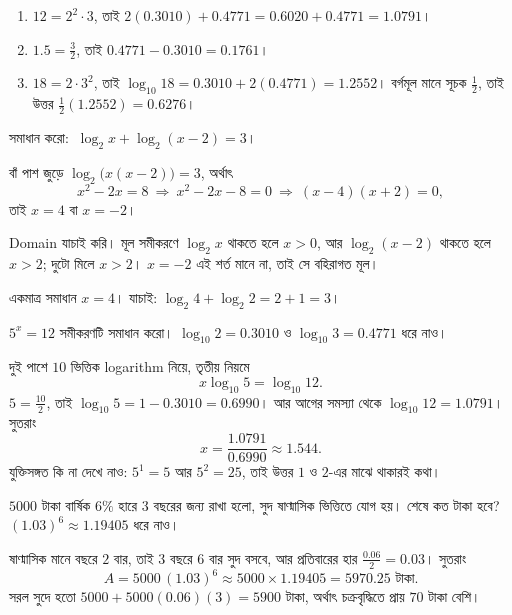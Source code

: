 \documentclass[11pt]{article}
\begin{document}
\begin{sol}
\begin{enumerate}
  \item $12 = 2^{2} \cdot 3$, তাই
        $2(0.3010) + 0.4771 = 0.6020 + 0.4771 = 1.0791$।
  \item $1.5 = \tfrac{3}{2}$, তাই $0.4771 - 0.3010 = 0.1761$।
  \item $18 = 2 \cdot 3^{2}$, তাই $\log_{10} 18 = 0.3010 + 2(0.4771) = 1.2552$।
        বর্গমূল মানে সূচক $\tfrac{1}{2}$, তাই উত্তর
        $\tfrac{1}{2}(1.2552) = 0.6276$।
\end{enumerate}
\end{sol}

 সমাধান করো: $\ \log_2 x + \log_2 (x - 2) = 3$।

\begin{sol}
বাঁ পাশ জুড়ে $\log_2 \big( x(x-2) \big) = 3$, অর্থাৎ
\[
  x^{2} - 2x = 8 \ \Longrightarrow\ x^{2} - 2x - 8 = 0
  \ \Longrightarrow\ (x-4)(x+2) = 0 ,
\]
তাই $x = 4$ বা $x = -2$।

Domain যাচাই করি। মূল সমীকরণে $\log_2 x$ থাকতে হলে $x > 0$, আর
$\log_2(x-2)$ থাকতে হলে $x > 2$; দুটো মিলে $x > 2$। $x = -2$ এই শর্ত মানে না,
তাই সে বহিরাগত মূল।

একমাত্র সমাধান $x = 4$। যাচাই: $\log_2 4 + \log_2 2 = 2 + 1 = 3$।
\end{sol}

 $5^{x} = 12$ সমীকরণটি সমাধান করো। $\log_{10} 2 = 0.3010$ ও
$\log_{10} 3 = 0.4771$ ধরে নাও।

\begin{sol}
দুই পাশে $10$ ভিত্তিক logarithm নিয়ে, তৃতীয় নিয়মে
\[
  x \log_{10} 5 = \log_{10} 12 .
\]
$5 = \tfrac{10}{2}$, তাই $\log_{10} 5 = 1 - 0.3010 = 0.6990$। আর আগের সমস্যা
থেকে $\log_{10} 12 = 1.0791$। সুতরাং
\[
  x = \frac{1.0791}{0.6990} \approx 1.544 .
\]
যুক্তিসঙ্গত কি না দেখে নাও: $5^{1} = 5$ আর $5^{2} = 25$, তাই উত্তর $1$ ও $2$-এর
মাঝে থাকারই কথা।
\end{sol}

 $5000$ টাকা বার্ষিক $6\%$ হারে $3$ বছরের জন্য রাখা হলো, সুদ
ষাণ্মাসিক ভিত্তিতে যোগ হয়। শেষে কত টাকা হবে? $(1.03)^{6} \approx 1.19405$
ধরে নাও।

\begin{sol}
ষাণ্মাসিক মানে বছরে $2$ বার, তাই $3$ বছরে $6$ বার সুদ বসবে, আর প্রতিবারের হার
$\tfrac{0.06}{2} = 0.03$। সুতরাং
\[
  A = 5000\,(1.03)^{6} \approx 5000 \times 1.19405 = 5970.25 \text{ টাকা} .
\]
সরল সুদে হতো $5000 + 5000(0.06)(3) = 5900$ টাকা, অর্থাৎ চক্রবৃদ্ধিতে প্রায়
$70$ টাকা বেশি।
\end{sol}
\end{document}
